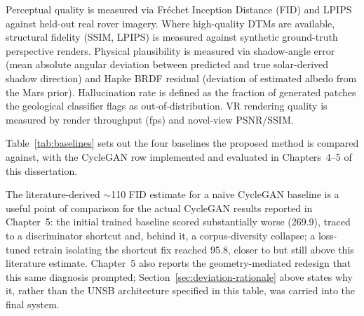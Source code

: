 Perceptual quality is measured via Fr\'{e}chet Inception Distance (FID) and LPIPS against held-out real rover imagery. Where high-quality DTMs are available, structural fidelity (SSIM, LPIPS) is measured against synthetic ground-truth perspective renders. Physical plausibility is measured via shadow-angle error (mean absolute angular deviation between predicted and true solar-derived shadow direction) and Hapke BRDF residual (deviation of estimated albedo from the Mars prior). Hallucination rate is defined as the fraction of generated patches the geological classifier flags as out-of-distribution. VR rendering quality is measured by render throughput (fps) and novel-view PSNR/SSIM.

Table~\ref{tab:baselines} sets out the four baselines the proposed method is compared against, with the CycleGAN row implemented and evaluated in Chapters~4--5 of this dissertation.

\begin{table}[H]
  \caption{Proposed method against baseline methods.}
  \label{tab:baselines}
  \centering
\end{table}

\noindent The literature-derived $\sim$110 FID estimate for a na\"{i}ve CycleGAN baseline is a useful point of comparison for the actual CycleGAN results reported in Chapter~5: the initial trained baseline scored substantially worse (269.9), traced to a discriminator shortcut and, behind it, a corpus-diversity collapse; a loss-tuned retrain isolating the shortcut fix reached 95.8, closer to but still above this literature estimate. Chapter~5 also reports the geometry-mediated redesign that this same diagnosis prompted; Section~\ref{sec:deviation-rationale} above states why it, rather than the UNSB architecture specified in this table, was carried into the final system.

